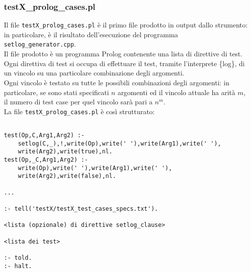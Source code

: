 \subsubsection{testX\_prolog\_cases.pl}
Il file \texttt{testX\_prolog\_cases.pl} è il primo file prodotto in output dallo strumento: in particolare, è il risultato dell'esecuzione del programma \texttt{setlog\_generator.cpp}.\\
Il file prodotto è un programma Prolog contenente una lista di direttive di test. \\
Ogni direttiva di test si occupa di effettuare il test, tramite l'interprete \{log\}, di un vincolo su una particolare combinazione degli argomenti.\\
Ogni vincolo è testato su tutte le possibili combinazioni degli argomenti: in particolare, se sono stati specificati $n$ argomenti ed il vincolo attuale ha arità $m$, il numero di test case per quel vincolo sarà pari a $n^m$.\\

La file \texttt{testX\_prolog\_cases.pl} è così strutturato: 

\begin{lstlisting}

test(Op,C,Arg1,Arg2) :-
    setlog(C,_),!,write(Op),write(' '),write(Arg1),write(' '),
    write(Arg2),write(true),nl.
test(Op,_C,Arg1,Arg2) :-
    write(Op),write(' '),write(Arg1),write(' '),
    write(Arg2),write(false),nl.
    
...

:- tell('testX/testX_test_cases_specs.txt').

<lista (opzionale) di direttive setlog_clause>

<lista dei test>

:- told.
:- halt.

\end{lstlisting}

